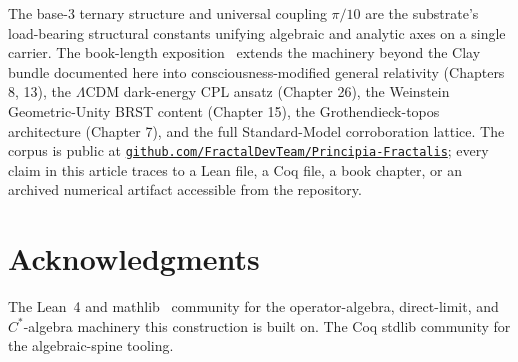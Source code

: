 \documentclass[11pt,a4paper]{amsart}
\theoremstyle{plain}
\theoremstyle{definition}
\begin{document}
The base-3 ternary structure and universal coupling $\pi/10$ are the substrate's load-bearing structural constants unifying algebraic and analytic axes on a single carrier. The book-length exposition~\cite{cohen2026book} extends the machinery beyond the Clay bundle documented here into consciousness-modified general relativity (Chapters 8, 13), the $\Lambda$CDM dark-energy CPL ansatz (Chapter 26), the Weinstein Geometric-Unity BRST content (Chapter 15), the Grothendieck-topos architecture (Chapter 7), and the full Standard-Model corroboration lattice. The corpus is public at \href{https://github.com/FractalDevTeam/Principia-Fractalis}{\texttt{github.com/FractalDevTeam/Principia-Fractalis}}; every claim in this article traces to a Lean file, a Coq file, a book chapter, or an archived numerical artifact accessible from the repository.

\section*{Acknowledgments}

The Lean~4 and mathlib~\cite{moura-ullrich2021,mathlib2020} community for the operator-algebra, direct-limit, and $C^*$-algebra machinery this construction is built on. The Coq stdlib community for the algebraic-spine tooling.
\end{document}
